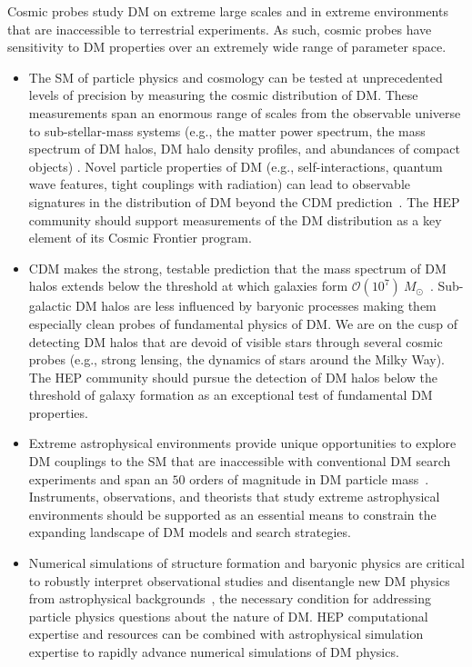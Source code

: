 \documentclass[nofootinbib]{article}
\begin{document}
\noindent Cosmic probes study DM on extreme large scales and in extreme environments that are inaccessible to terrestrial experiments.
As such, cosmic probes have sensitivity to DM properties over an extremely wide range of parameter space.

\begin{itemize}[nosep]

\item The SM of particle physics and cosmology can be tested at unprecedented levels of precision by measuring the cosmic distribution of DM. These measurements span an enormous range of scales from the observable universe to sub-stellar-mass systems
(e.g., the matter power spectrum, the mass spectrum of DM halos, DM halo density profiles, and abundances of compact objects)
\cite{Bechtol:2022koa,Bird:2022wvk,Brito:2022lmd}. Novel particle properties of DM (e.g., self-interactions, quantum wave features, tight couplings with radiation) can lead to observable signatures in the distribution of DM beyond the CDM prediction~\cite{Bechtol:2022koa,Drlica-Wagner:2022lbd}. The HEP community should support measurements of the DM distribution as a key element of its Cosmic Frontier program.

\item CDM makes the strong, testable prediction that the mass spectrum of DM halos extends below the threshold at which galaxies form $\mathcal{O}(10^7)~M_{\odot}$~\cite{Bechtol:2022koa}. Sub-galactic DM halos are less influenced by baryonic processes making them especially clean probes of fundamental physics of DM. 
We are on the cusp of detecting DM halos that are devoid of visible stars through several cosmic probes (e.g., strong lensing, the dynamics of stars around the Milky Way). The HEP community should pursue the detection of DM halos below the threshold of galaxy formation as an exceptional test of fundamental DM properties.

\item Extreme astrophysical environments provide unique opportunities to explore DM couplings to the SM that are inaccessible with conventional DM search experiments and span an $50$ orders of magnitude in DM particle mass~\cite{Berti:2022rwn}. Instruments, observations, and theorists that study extreme astrophysical environments should be supported as an essential means to constrain the expanding landscape of DM models and search strategies.

\item Numerical simulations of structure formation and baryonic physics are critical to robustly interpret observational studies and disentangle new DM physics from astrophysical backgrounds~\cite{Banerjee:2022qcb}, the necessary condition for addressing particle physics questions about the nature of DM. HEP computational expertise and resources can be combined with astrophysical simulation expertise to rapidly advance numerical simulations of DM physics.


\end{itemize}
\end{document}
